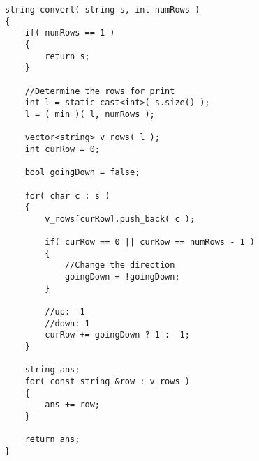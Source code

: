 \setcounter{lstlisting}{0}
\begin{lstlisting}[style=customc, caption={Sort By Row}]
string convert( string s, int numRows )
{
    if( numRows == 1 )
    {
        return s;
    }

    //Determine the rows for print
    int l = static_cast<int>( s.size() );
    l = ( min )( l, numRows );

    vector<string> v_rows( l );
    int curRow = 0;

    bool goingDown = false;

    for( char c : s )
    {
        v_rows[curRow].push_back( c );

        if( curRow == 0 || curRow == numRows - 1 )
        {
            //Change the direction
            goingDown = !goingDown;
        }

        //up: -1
        //down: 1
        curRow += goingDown ? 1 : -1;
    }

    string ans;
    for( const string &row : v_rows )
    {
        ans += row;
    }

    return ans;
}
\end{lstlisting}
